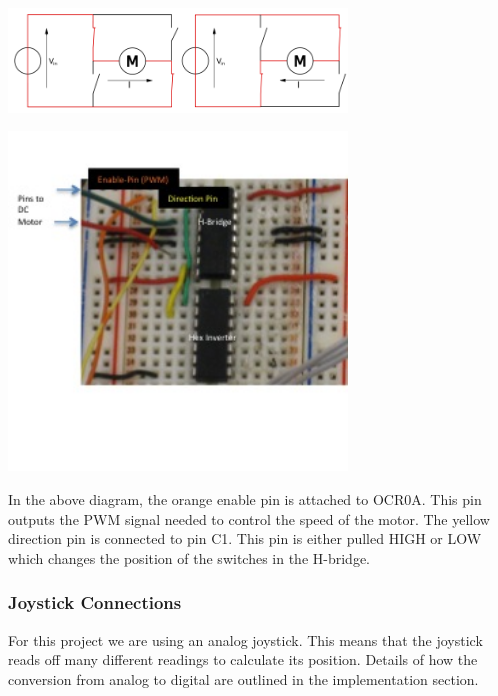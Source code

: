   \begin{center}
    \includegraphics[width=90mm]{imageSources/hBridgeConnect1.png}
  \end{center}
  \label{hBridgeConnect1}



  \begin{center}
    \includegraphics[width=90mm]{imageSources/hBridgeConnect2.png}
  \end{center}
  \label{hBridgeConnect2}


In the above diagram, the orange enable pin is attached to OCR0A. This pin outputs the PWM signal needed to control the speed of the motor.  The yellow direction pin is connected to pin C1. This pin is either pulled HIGH or LOW which changes the position of the switches in the H-bridge.

\subsubsection{Joystick Connections}

For this project we are using an analog joystick. This means that  the joystick reads off many different readings to calculate its position. Details of how the conversion from analog to digital are outlined in the implementation section.

